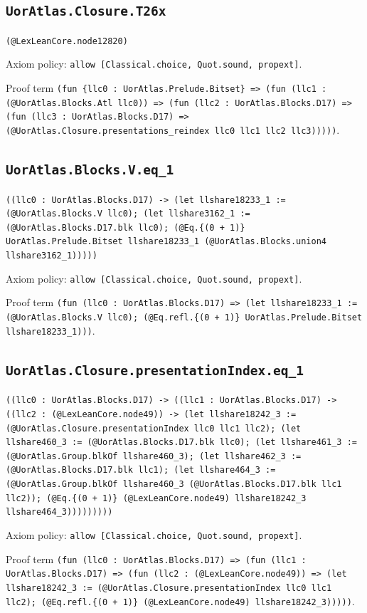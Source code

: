 \documentclass[11pt]{article}
\begin{document}
\subsection*{\texttt{UorAtlas.Closure.T26x}}
\noindent\texttt{(@LexLeanCore.node12820)}\par
\noindent Axiom policy: \texttt{allow [Classical.choice, Quot.sound, propext]}.\par
\noindent Proof term \texttt{(fun \{llc0 : UorAtlas.Prelude.Bitset\} => (fun (llc1 : (@UorAtlas.Blocks.Atl llc0)) => (fun (llc2 : UorAtlas.Blocks.D17) => (fun (llc3 : UorAtlas.Blocks.D17) => (@UorAtlas.Closure.presentations\_reindex llc0 llc1 llc2 llc3)))))}.\par
\subsection*{\texttt{UorAtlas.Blocks.V.eq\_1}}
\noindent\texttt{((llc0 : UorAtlas.Blocks.D17) -> (let llshare18233\_1 := (@UorAtlas.Blocks.V llc0); (let llshare3162\_1 := (@UorAtlas.Blocks.D17.blk llc0); (@Eq.\{(0 + 1)\} UorAtlas.Prelude.Bitset llshare18233\_1 (@UorAtlas.Blocks.union4 llshare3162\_1)))))}\par
\noindent Axiom policy: \texttt{allow [Classical.choice, Quot.sound, propext]}.\par
\noindent Proof term \texttt{(fun (llc0 : UorAtlas.Blocks.D17) => (let llshare18233\_1 := (@UorAtlas.Blocks.V llc0); (@Eq.refl.\{(0 + 1)\} UorAtlas.Prelude.Bitset llshare18233\_1)))}.\par
\subsection*{\texttt{UorAtlas.Closure.presentationIndex.eq\_1}}
\noindent\texttt{((llc0 : UorAtlas.Blocks.D17) -> ((llc1 : UorAtlas.Blocks.D17) -> ((llc2 : (@LexLeanCore.node49)) -> (let llshare18242\_3 := (@UorAtlas.Closure.presentationIndex llc0 llc1 llc2); (let llshare460\_3 := (@UorAtlas.Blocks.D17.blk llc0); (let llshare461\_3 := (@UorAtlas.Group.blkOf llshare460\_3); (let llshare462\_3 := (@UorAtlas.Blocks.D17.blk llc1); (let llshare464\_3 := (@UorAtlas.Group.blkOf llshare460\_3 (@UorAtlas.Blocks.D17.blk llc1 llc2)); (@Eq.\{(0 + 1)\} (@LexLeanCore.node49) llshare18242\_3 llshare464\_3)))))))))}\par
\noindent Axiom policy: \texttt{allow [Classical.choice, Quot.sound, propext]}.\par
\noindent Proof term \texttt{(fun (llc0 : UorAtlas.Blocks.D17) => (fun (llc1 : UorAtlas.Blocks.D17) => (fun (llc2 : (@LexLeanCore.node49)) => (let llshare18242\_3 := (@UorAtlas.Closure.presentationIndex llc0 llc1 llc2); (@Eq.refl.\{(0 + 1)\} (@LexLeanCore.node49) llshare18242\_3)))))}.\par
\end{document}
